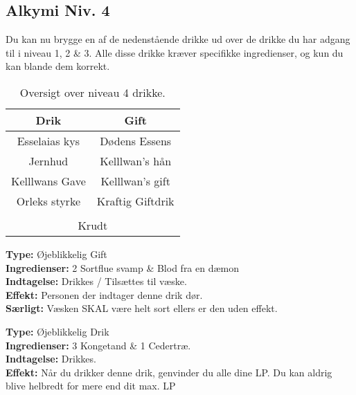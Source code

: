 \subsection{Alkymi Niv. 4}
Du kan nu brygge en af de nedenstående drikke ud over de drikke du har adgang til i niveau 1, 2 \& 3. Alle disse drikke kræver specifikke ingredienser, og kun du kan blande dem korrekt.\\

\begin{table}[H]
    \centering
    \begin{tabular}{|c|c|}
        \rowcolor{cerulean!80}\hline
        Drik & Gift \\\hline
        Esselaias kys & Dødens Essens \\\hline
        Jernhud & Kelllwan’s hån \\\hline
        Kelllwans Gave & Kelllwan’s gift \\\hline
        Orleks styrke & Kraftig Giftdrik \\\hline
        \rowcolor{cerulean!80}\hline
        \multicolumn{2}{|c|}{Speciel} \\\hline
        \multicolumn{2}{|c|}{Krudt} \\\hline
    \end{tabular}
    \caption{Oversigt over niveau 4 drikke.}
\end{table}

\begin{gift*}
\textbf{Type:} Øjeblikkelig Gift\\
\textbf{Ingredienser:} 2 Sortflue svamp \& Blod fra en dæmon\\
\textbf{Indtagelse:} Drikkes / Tilsættes til væske.\\
\textbf{Effekt:} Personen der indtager denne drik dør.\\
\textbf{Særligt:} Væsken SKAL være helt sort ellers er den uden effekt.\\
\end{gift*}

\begin{drik*}
\textbf{Type:} Øjeblikkelig Drik\\
\textbf{Ingredienser:} 3 Kongetand \& 1 Cedertræ.\\
\textbf{Indtagelse:} Drikkes.\\
\textbf{Effekt:} Når du drikker denne drik, genvinder du alle dine LP.  Du kan aldrig blive helbredt for mere end dit max. LP
\end{drik*}

